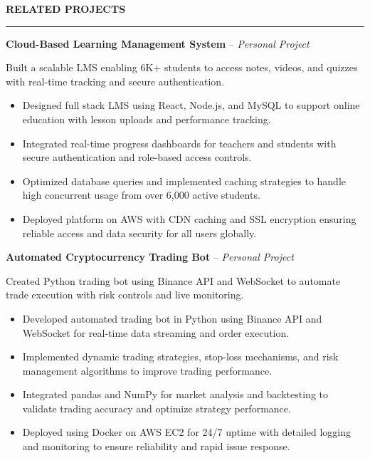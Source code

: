\documentclass[10pt,letterpaper]{article}
\begin{document}
\vspace{6pt}

\textbf{RELATED PROJECTS}\\[-8pt]
\noindent\rule{\textwidth}{1pt}

\vspace{-2pt}

\textbf{Cloud-Based Learning Management System} -- \emph{Personal Project}

\vspace{-1pt}

Built a scalable LMS enabling 6K+ students to access notes, videos, and quizzes with real-time tracking and secure authentication.
\vspace{-1pt}
\begin{itemize}
\item Designed full stack LMS using React, Node.js, and MySQL to support online education with lesson uploads and performance tracking.
\item Integrated real-time progress dashboards for teachers and students with secure authentication and role-based access controls.
\item Optimized database queries and implemented caching strategies to handle high concurrent usage from over 6,000 active students.
\item Deployed platform on AWS with CDN caching and SSL encryption ensuring reliable access and data security for all users globally.
\end{itemize}

\textbf{Automated Cryptocurrency Trading Bot} -- \emph{Personal Project}

\vspace{-1pt}

Created Python trading bot using Binance API and WebSocket to automate trade execution with risk controls and live monitoring.
\vspace{-1pt}
\begin{itemize}
\item Developed automated trading bot in Python using Binance API and WebSocket for real-time data streaming and order execution.
\item Implemented dynamic trading strategies, stop-loss mechanisms, and risk management algorithms to improve trading performance.
\item Integrated pandas and NumPy for market analysis and backtesting to validate trading accuracy and optimize strategy performance.
\item Deployed using Docker on AWS EC2 for 24/7 uptime with detailed logging and monitoring to ensure reliability and rapid issue response.
\end{itemize}
\end{document}
